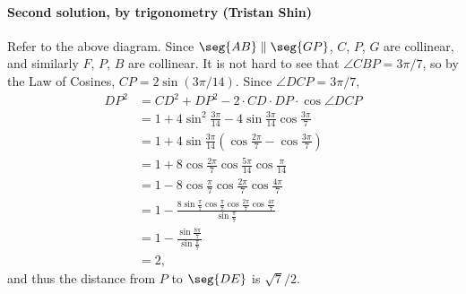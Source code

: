 \paragraph{Second solution, by trigonometry (Tristan Shin)}     Refer to the above diagram. Since $\seg{AB}\parallel\seg{GP}$, $C$, $P$, $G$ are collinear, and similarly $F$, $P$, $B$ are collinear. It is not hard to see that $\angle CBP=3\pi/7$, so by the Law of Cosines, $CP=2\sin(3\pi/14)$. Since $\angle DCP=3\pi/7$,
\begin{align*}
    DP^2&=CD^2+DP^2-2\cdot CD\cdot DP\cdot\cos\angle DCP\\
    &=1+4\sin^2\frac{3\pi}{14}-4\sin\frac{3\pi}{14}\cos\frac{3\pi}7\\
    &=1+4\sin\frac{3\pi}{14}\left(\cos\frac{2\pi}7-\cos\frac{3\pi}7\right)\\
    &=1+8\cos\frac{2\pi}7\cos\frac{5\pi}{14}\cos\frac{\pi}{14}\\
    &=1-8\cos\frac\pi7\cos\frac{2\pi}7\cos\frac{4\pi}7\\
    &=1-\frac{8\sin\frac\pi7\cos\frac\pi7\cos\frac{2\pi}7\cos\frac{4\pi}7}{\sin\frac\pi7}\\
    &=1-\frac{\sin\frac{8\pi}7}{\sin\frac\pi7}\\
    &=2,
\end{align*}
and thus the distance from $P$ to $\seg{DE}$ is $\sqrt7/2$.


